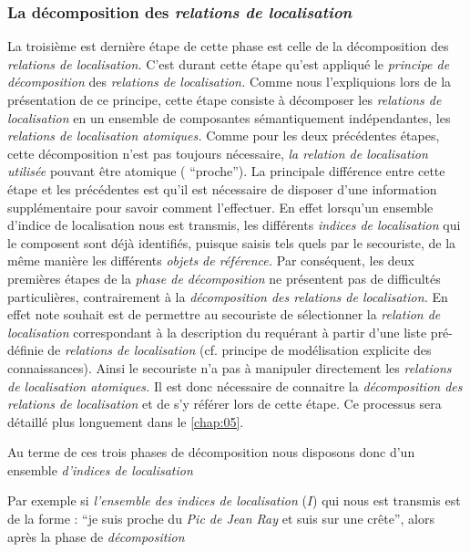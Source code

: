 \subsubsection{La décomposition des \emph{relations de localisation}}

La troisième est dernière étape de cette phase est celle de la
décomposition des \emph{relations de localisation.} C'est durant cette
étape qu'est appliqué le \emph{principe de décomposition} des
\emph{relations de localisation.} Comme nous l'expliquions lors de la
présentation de ce principe, cette étape consiste à décomposer les
\emph{relations de localisation} en un ensemble de composantes
sémantiquement indépendantes, les \emph{relations de localisation
  atomiques.} Comme pour les deux précédentes étapes, cette
décomposition n'est pas toujours nécessaire, \emph{la relation de
  localisation utilisée} pouvant être atomique (\eg
\enquote{proche}). La principale différence entre cette étape et les
précédentes est qu'il est nécessaire de disposer d'une information
supplémentaire pour savoir comment l'effectuer. En effet lorsqu'un
ensemble d'indice de localisation nous est transmis, les différents
\emph{indices de localisation} qui le composent sont déjà identifiés,
puisque saisis tels quels par le secouriste, de la même manière les
différents \emph{objets de référence.} Par conséquent, les deux
premières étapes de la \emph{phase de décomposition} ne présentent pas
de difficultés particulières, contrairement à la \emph{décomposition
  des relations de localisation.} En effet note souhait est de
permettre au secouriste de sélectionner la \emph{relation de
  localisation} correspondant à la description du requérant à partir
d'une liste pré-définie de \emph{relations de localisation}
(cf. principe de modélisation explicite des connaissances). Ainsi le
secouriste n'a pas à manipuler directement les \emph{relations de
  localisation atomiques.} Il est donc nécessaire de connaitre la
\emph{décomposition des relations de localisation} et de s'y référer
lors de cette étape. Ce processus sera détaillé plus longuement dans
le \autoref{chap:05}.


Au terme de ces trois phases de décomposition nous disposons donc d'un
ensemble \emph{d'indices de localisation}

Par exemple si \emph{l'ensemble des indices de localisation} (\(I\))
qui nous est transmis est de la forme : \enquote{je suis proche du
  \emph{Pic de Jean Ray} et suis sur une crête}, alors après
la phase de \emph{décomposition} 





